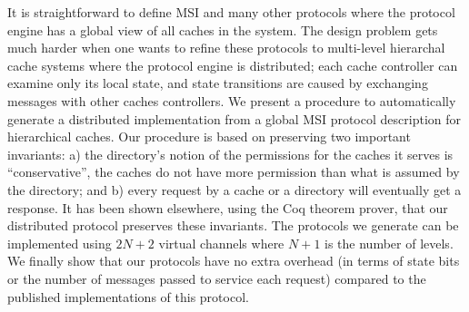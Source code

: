 


It is straightforward to define MSI and many other protocols where the protocol
engine has a global view of all caches in the system.  The design problem gets
much harder when one wants to refine these protocols to multi-level hierarchal
cache systems where the protocol engine is distributed; each cache controller
can examine only its local state, and state transitions are caused by
exchanging messages with other caches controllers. We present a procedure to
automatically generate a distributed implementation from a global MSI protocol
description for hierarchical caches. Our procedure is based on preserving two
important invariants: a) the directory's notion of the permissions for the
caches it serves is ``conservative'', \ie the caches do not have more
permission than what is assumed by the directory; and b) every request by a
cache or a directory will eventually get a response. It has been shown
elsewhere, using the Coq theorem prover, that our distributed protocol
preserves these invariants.  The protocols we generate can be implemented using
$2N + 2$ virtual channels where $N + 1$ is the number of levels. We finally show
that our protocols have no extra overhead (in terms of state bits or the number
of messages passed to service each request) compared to the published
implementations of this protocol. 
 


